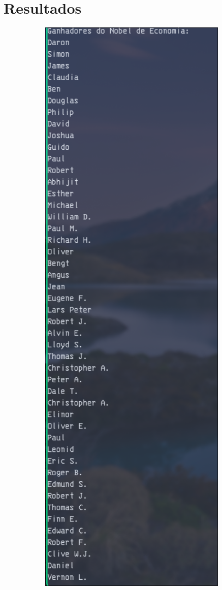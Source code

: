 \documentclass[
	12pt,				%
	oneside,			%
	a4paper,			%
	english,			%
	brazil,				%
	]{abntex2}
\begin{document}
{\section{Resultados}

\begin{figure}[H]
    \centering
    \includegraphics[width=1\textwidth]{imgs/img1.png}
    \label{fig:img1}
\end{figure}

}
\end{document}
